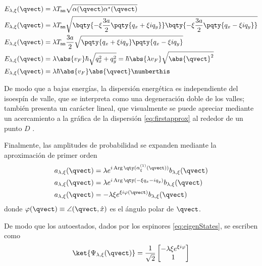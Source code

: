 \begin{align*}
	E_{\lambda, \xi} (\qvect) &= \lambda T_\mathtt{nn} \sqrt{ \alpha(\qvect) \alpha^*(\qvect)} \\ 
	E_{\lambda, \xi} (\qvect) &= \lambda T_\mathtt{nn} \sqrt{\bqty{-\xi \frac{3a}{2} \pqty{q_x +\xi i q_y}} \bqty{-\xi \frac{3a}{2} \pqty{q_x -\xi i q_y}} } \\ 
	E_{\lambda, \xi} (\qvect) &= \lambda T_\mathtt{nn} \frac{3a}{2} \sqrt{ \pqty{q_x +\xi i q_y} \pqty{q_x -\xi i q_y} } \\
	E_{\lambda, \xi} (\qvect) &= \lambda \abs{v_F} \hbar \sqrt{q_x^2 + q_y^2} =  \hbar \abs{\lambda v_F} \sqrt{\abs{\qvect}^2} \\ 
	E_{\lambda, \xi} (\qvect) &= \lambda \hbar \abs{v_F} \abs{\qvect} \numberthis\label{eq:LowEnergyDis}
\end{align*}

De modo que a bajas energías, la dispersión energética es independiente del isoespín 
de valle, que se interpreta como una degeneración doble de los valles; también 
presenta un carácter lineal, que visualmente se puede apreciar mediante un 
acercamiento a la gráfica de la dispersión \eqref{eq:firstapprox} al rededor de un 
punto $ D $ .

Finalmente, las amplitudes de probabilidad se expanden mediante la aproximación de 
primer orden
\begin{align*}
	a_{\lambda, \xi} (\qvect) &= \lambda e^{i \operatorname{Arg}\qty(\alpha^{(1)}_{\xi} (\qvect) )} b_{\lambda, \xi} (\qvect) \\ 
	a_{\lambda, \xi} (\qvect) &= \lambda e^{i \operatorname{Arg}\qty( -\xi q_x - i q_y )} b_{\lambda, \xi} (\qvect) \\
	a_{\lambda, \xi} (\qvect) &= - \lambda \xi e^{\xi i \varphi(\qvect)} b_{\lambda, \xi} (\qvect)		
\end{align*}
donde $ \varphi (\qvect) \equiv \angle(\qvect, \hat x) $ es el ángulo polar de $ \qvect $.

De modo que los autoestados, dados por los espinores \eqref{eq:eigenStates}, se 
escriben como
\begin{equation}\label{eq:lowEigenStates}
	\ket{\Psi_{\lambda, \xi} (\qvect)} = \frac{1}{\sqrt2} \begin{bmatrix} - \lambda \xi e^{\xi i \varphi} \\ 1 \end{bmatrix}
\end{equation}
